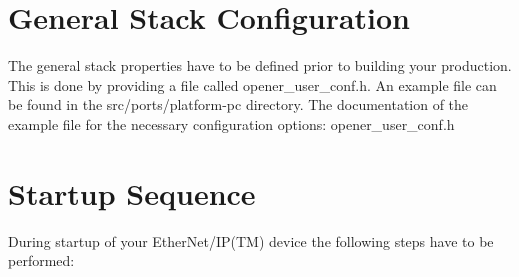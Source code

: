 \hypertarget{dc/dcb/porting_gen_config_section}{}\section{\-General Stack Configuration}\label{dc/dcb/porting_gen_config_section}
\-The general stack properties have to be defined prior to building your production. \-This is done by providing a file called opener\-\_\-user\-\_\-conf.\-h. \-An example file can be found in the src/ports/platform-\/pc directory. \-The documentation of the example file for the necessary configuration options\-: opener\-\_\-user\-\_\-conf.\-h

\hypertarget{dc/dcb/porting_startup_sec}{}\section{\-Startup Sequence}\label{dc/dcb/porting_startup_sec}
\-During startup of your \-Ether\-Net/\-I\-P(\-T\-M) device the following steps have to be performed\-:
